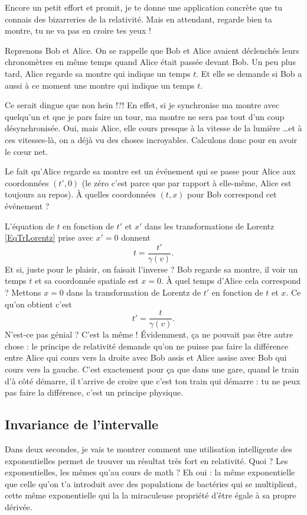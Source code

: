 Encore un petit effort et promit, je te donne une application concrète que tu connais des bizarreries de la relativité. Mais en attendant, regarde bien ta montre, tu ne va pas en croire tes yeux !

Reprenons Bob et Alice. On se rappelle que Bob et Alice avaient déclenchés leurs chronomètres en même temps quand Alice était passée devant Bob. Un peu plus tard, Alice regarde sa montre qui indique un temps $t$. Et elle se demande si Bob a aussi à ce moment une montre qui indique un temps $t$.

Ce serait dingue que non hein !?! En effet, si je synchronise ma montre avec quelqu'un et que je pars faire un tour, ma montre ne sera pas tout d'un coup  désynchronisée. Oui, mais Alice, elle cours presque à la vitesse de la lumière \ldots et à ces vitesses-là, on a déjà vu des choses incroyables. Calculons donc pour en avoir le c\oe ur net.

Le fait qu'Alice regarde sa montre est un événement qui se passe pour Alice aux coordonnées $(t',0)$ (le zéro c'est parce que par rapport à elle-même, Alice est toujours au repos). À quelles coordonnées $(t,x)$ pour Bob correspond cet événement ?

L'équation de $t$ en fonction de $t'$ et $x'$ dans les transformations de Lorentz \eqref{EqTrLorentz} prise avec $x'=0$ donnent
\[
  t=\frac{ t' }{ \gamma(v) }.
\]
Et si, juste pour le plaisir, on faisait l'inverse ? Bob regarde sa montre, il voir un temps $t$ et sa coordonnée spatiale est $x=0$. À quel temps d'Alice cela correspond ? Mettons $x=0$ dans la transformation de Lorentz de $t'$ en fonction de $t$ et $x$. Ce qu'on obtient c'est
\[
  	t'=\frac{ t }{ \gamma(v) }.
\]
N'est-ce pas génial ? C'est la même ! Évidemment, ça ne pouvait pas être autre chose : le principe de relativité demande qu'on ne puisse pas faire la différence entre Alice qui cours vers la droite avec Bob assis et Alice assise avec Bob qui cours vers la gauche. C'est exactement pour ça que dans une gare, quand le train d'à côté démarre, il t'arrive de croire que c'est ton train qui démarre : tu ne peux pas faire la différence, c'est un principe physique.


\subsection{Invariance de l'intervalle}

Dans deux secondes, je vais te montrer comment une utilisation intelligente des exponentielles permet de trouver un résultat très fort en relativité. Quoi ? Les exponentielles, les mêmes qu'au cours de math ? Eh oui : la même exponentielle que celle qu'on t'a introduit avec des populations de bactéries qui se multiplient, cette même exponentielle qui la la miraculeuse propriété d'être égale à sa propre dérivée.

